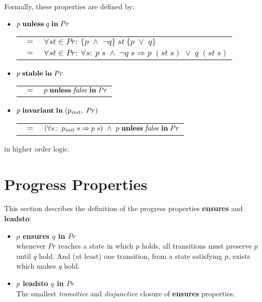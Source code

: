 Formally, these properties are defined by:
\begin{itemize}
  \item $p\;{\bf unless}\;q\;{\bf in}\;Pr$\\
     \begin{tabular}{ll}
       $\ \;=$ & $\forall st \in Pr\!:\
                     \{p\;\wedge\;\neg q\}\ st\ \{p\;\vee\;q\}$\\
       $\ \;=$ & $\forall st \in Pr\!:\ \forall s\!:\
              p\;s\;\wedge\;\neg q\;s \Rightarrow p\;(st\;s)\;\vee\;q\;(st\;s)$
     \end{tabular}
  \item $p\;{\bf stable}\;{\bf in}\;Pr$\\
     \begin{tabular}{ll}
       $\ \;=$ & $p\;{\bf unless}\;{\it false}\;{\bf in}\;Pr$
     \end{tabular}
  \item $p\;{\bf invariant}\;{\bf in}\;(p_{\it init},\;Pr)$\\
     \begin{tabular}{ll}
       $\ \;=$ & $(\forall s\!:\  p_{\it init}\;s \Rightarrow p\;s)\
                   \wedge\ p\;{\bf unless}\;{\it false}\;{\bf in}\;Pr$
     \end{tabular}
\end{itemize}
in higher order logic.

\section{Progress Properties}

This section describes the definition of the progress properties
{\bf ensures} and {\bf leadsto}:
\begin{itemize}
  \item {\bf $p$ ensures $q$ in $Pr$} \ \\  
    whenever $Pr$ reaches a state in which $p$ holds, all transitions must
    preserve $p$ until $q$ hold. And (at least) one transition, from a state
    satisfying $p$, exists which makes $q$ hold.
  \item {\bf $p$ leadsto $q$ in $Pr$} \ \\  
    The smallest  {\it transitive} and {\it disjunctive}
    closure of \mbox{\bf ensures} properties.
\end{itemize}

